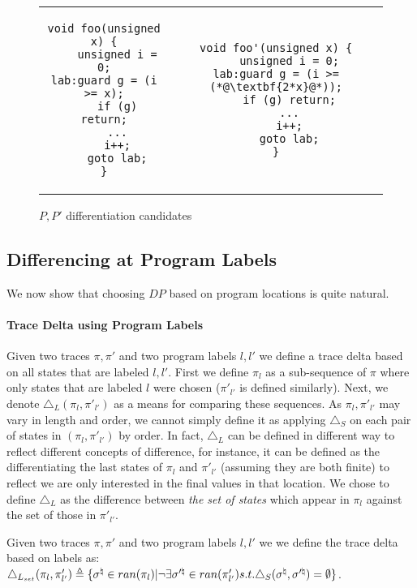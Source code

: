 \begin{figure}
\begin{tabular}{cc}
\centering
\begin{lstlisting}
void foo(unsigned x) {
    unsigned i = 0;
lab:guard g = (i >= x);
    if (g) return;
    ...
    i++;
    goto lab;
}
\end{lstlisting}
&
\begin{lstlisting}
void foo'(unsigned x) {
    unsigned i = 0;
lab:guard g = (i >= (*@\textbf{2*x}@*));
    if (g) return;
    ...
    i++;
    goto lab;
}
\end{lstlisting}
\end{tabular}
\caption{$P,P'$ differentiation candidates}
\end{figure}

\subsection{Differencing at Program Labels} 

We now show that choosing $DP$ based on program locations is quite natural.

\paragraph{Trace Delta using Program Labels} 
Given two traces $\pi,\pi'$ and two program labels $l,l'$ we define a trace delta based on all states that are labeled $l,l'$. First we define $\pi_{l}$ as a sub-sequence of $\pi$ where only states that are labeled $l$ were chosen ($\pi'_{l'}$ is defined similarly). Next, we denote $\triangle_L(\pi_{l},\pi'_{l'})$ as a means for comparing these sequences. As $\pi_{l},\pi'_{l'}$ may vary in length and order, we cannot simply define it as applying $\triangle_{S}$ on each pair of states in $(\pi_{l},\pi'_{l'})$ by order. In fact, $\triangle_{L}$ can be defined in different way to reflect different concepts of difference, for instance, it can be defined as the differentiating the last states of $\pi_{l}$ and $\pi'_{l'}$ (assuming they are both finite) to reflect we are only interested in the final values in that location. We chose to define $\triangle_{L}$ as the difference between \emph{the set of states} which appear in $\pi_{l}$ against the set of those in $\pi'_{l'}$.
\begin{definition}
Given two traces $\pi,\pi'$ and two program labels $l,l'$ we we define the trace delta based on labels as:
$\triangle_{L_{set}}(\pi_{l},\pi'_{l'}) \triangleq \{ \sigma^\natural \in ran(\pi_{l}) | \neg \exists \sigma'^\natural \in ran(\pi'_{l'}) s.t. \triangle_{S}(\sigma^\natural,\sigma'^\natural) = \emptyset \}$.
\end{definition}

